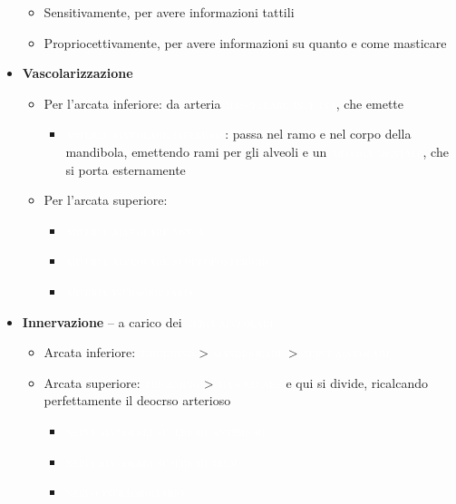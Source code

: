 \documentclass[italian,]{article}
\providecommand{\tightlist}{%
  \setlength{\itemsep}{0pt}\setlength{\parskip}{0pt}}
\newcommand{\art}[1]{\colorbox{RedOrange}{\textcolor{white}{\textsc{#1}}}}
\newcommand{\ner}[1]{\colorbox{Dandelion}{\textcolor{white}{\textsc{#1}}}}
\begin{document}
\begin{itemize}
  \begin{itemize}
  \tightlist
  \item
    Sensitivamente, per avere informazioni tattili
  \item
    Propriocettivamente, per avere informazioni su quanto e come
    masticare
  \end{itemize}
\item
  \textbf{Vascolarizzazione}

  \begin{itemize}
  \tightlist
  \item
    Per l'arcata inferiore: da arteria \art{mascellare interna}, che
    emette

    \begin{itemize}
    \tightlist
    \item
      \art{arteria alveolare inferiore}: passa nel ramo e nel corpo
      della mandibola, emettendo rami per gli alveoli e un
      \art{arteria mentale}, che si porta esternamente
    \end{itemize}
  \item
    Per l'arcata superiore:

    \begin{itemize}
    \tightlist
    \item
      \art{arteria alveolare media}~
    \item
      \art{arteria alveolare superoposteriore}~
    \item
      \art{arteria infraorbitaria}~
    \end{itemize}
  \end{itemize}
\item
  \textbf{Innervazione} -- a carico dei \ner{nervi alveolari}

  \begin{itemize}
  \tightlist
  \item
    Arcata inferiore: \ner{trigemino} \textgreater{} \ner{mandibolare}
    \textgreater{} \ner{nervi alveolari}
  \item
    Arcata superiore: \ner{trigemino} \textgreater{} \ner{mascellare} e
    qui si divide, ricalcando perfettamente il deocrso arterioso

    \begin{itemize}
    \item
      \ner{nervi alveolari superiori anteriori}
    \item
      \ner{nervi alveolari superiori medi}
    \item
      \ner{nervo infraorbitario}
    \end{itemize}
  \end{itemize}
\end{itemize}
\end{document}
